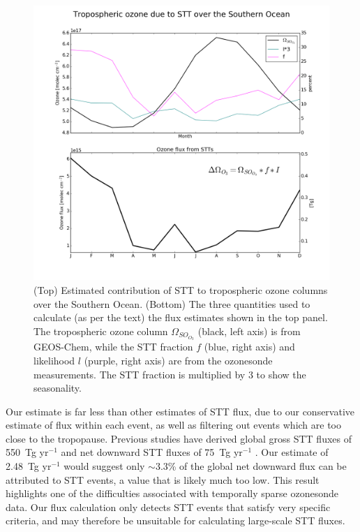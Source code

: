 \documentclass{article}
\begin{document}
  \begin{figure}[!htbp]
    \includegraphics[width=\textwidth]{figures/SO_extrapolation.png}
    \caption{(Top) Estimated contribution of STT to tropospheric ozone columns over the Southern Ocean.
      (Bottom) The three quantities used to calculate (as per the text) the flux estimates shown in the top panel.
      The tropospheric ozone column $\Omega_{SO_{O_3}}$ (black, left axis) is from GEOS-Chem, while the STT fraction $f$ (blue, right axis) and likelihood $l$ (purple, right axis) are from the ozonesonde measurements.
      The STT fraction is multiplied by 3 to show the seasonality.}
    \label{fig:SOExtrapolation}
  \end{figure}
  
  Our estimate is far less than other estimates of STT flux, due to our conservative estimate of flux within each event, as well as filtering out events which are too close to the tropopause.
  Previous studies have derived global gross STT fluxes of 550~Tg yr$^{-1}$ \citep{Stevenson2006} and net downward STT fluxes of 75~Tg yr$^{-1}$ \citep{Sprenger2003}.
  Our estimate of 2.48~Tg yr$^{-1}$ would suggest only $\sim$3.3\% of the global net downward flux can be attributed to STT events, a value that is likely much too low.
  This result highlights one of the difficulties associated with temporally sparse ozonesonde data.
  Our flux calculation only detects STT events that satisfy very specific criteria, and may therefore be unsuitable for calculating large-scale STT fluxes.
  
\end{document}
